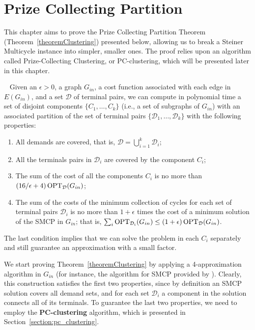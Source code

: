 \chapter{Prize Collecting Partition}
\label{chapter:pc-partition}

This chapter aims to prove the Prize Collecting Partition Theorem (Theorem~\ref{theoremClustering}) presented below, allowing us to break a Steiner Multicycle instance into simpler, smaller ones. The proof relies upon an algorithm called Prize-Collecting Clustering, or PC-clustering, which will be presented later in this chapter.

\begin{ftheo}~\label{theoremClustering}
Given an \(\epsilon > 0\), a graph \(G_{in}\), a cost function associated with each edge in \(E(G_{in})\), and a set \(\mathcal{D}\) of terminal pairs, we can compute in polynomial time a set of disjoint components \(\{C_1, \dots, C_k\}\) (i.e., a set of subgraphs of \(G_{in}\)) with an associated partition of the set of terminal pairs \(\{\mathcal{D}_1, \dots, \mathcal{D}_k\}\) with the following properties:
\begin{enumerate}
    \item All demands are covered, that is, \(\mathcal{D} = \bigcup_{i=1}^k \mathcal{D}_i\); \label{condition_t_clust:1}
    \item All the terminals pairs in \(\mathcal{D}_i\) are covered by the component \(C_i\); \label{condition_t_clust:2}
    \item The sum of the cost of all the components \(C_i\) is no more than \((16/\epsilon + 4) \operatorname{\textrm{OPT}}_{\mathcal{D}}(G_{in})\); \label{condition_t_clust:3}
    \item The sum of the costs of the minimum collection of cycles for each set of terminal pairs \(\mathcal{D}_i\) is no more than \(1 + \epsilon\) times the cost of a minimum solution of the SMCP in \(G_{in}\); that is, \(\sum_i \operatorname{\textrm{OPT}}_{\mathcal{D}_i} (G_{in}) \leq (1 + \epsilon) \operatorname{\textrm{OPT}}_{\mathcal{D}} (G_{in})\). \label{condition_t_clust:4}
\end{enumerate}
\end{ftheo}

The last condition implies that we can solve the problem in each \(C_i\) separately and still guarantee an approximation with a small factor.

We start proving Theorem~\ref{theoremClustering} by applying a 4-approximation algorithm in \(G_{in}\) (for instance, the algorithm for SMCP provided by \cite{Pereira2018TheSM}). Clearly, this construction satisfies the first two properties, since by definition an SMCP solution covers all demand sets, and for each set \(\mathcal{D}_i\) a component in the solution connects all of its terminals. To guarantee the last two properties, we need to employ the \textbf{PC-clustering} algorithm, which is presented in Section~\ref{section:pc_clustering}.

